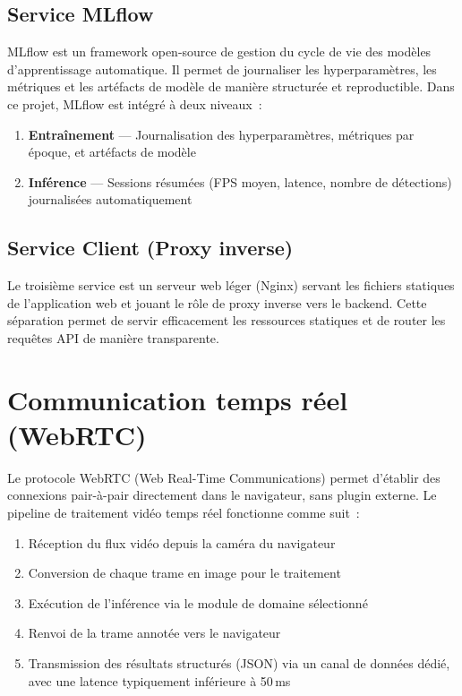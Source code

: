 \documentclass[12pt,a4paper]{report}
\begin{document}
\subsection{Service MLflow}

MLflow est un framework open-source de gestion du cycle de vie des mod\`eles d'apprentissage automatique. Il permet de journaliser les hyperparam\`etres, les m\'etriques et les art\'efacts de mod\`ele de mani\`ere structur\'ee et reproductible. Dans ce projet, MLflow est int\'egr\'e \`a deux niveaux~:
\begin{enumerate}
    \item \textbf{Entra\^inement} --- Journalisation des hyperparam\`etres, m\'etriques par \'epoque, et art\'efacts de mod\`ele
    \item \textbf{Inf\'erence} --- Sessions r\'esum\'ees (FPS moyen, latence, nombre de d\'etections) journalis\'ees automatiquement
\end{enumerate}

\subsection{Service Client (Proxy inverse)}

Le troisi\`eme service est un serveur web l\'eger (Nginx) servant les fichiers statiques de l'application web et jouant le r\^ole de proxy inverse vers le backend. Cette s\'eparation permet de servir efficacement les ressources statiques et de router les requ\^etes API de mani\`ere transparente.

\section{Communication temps r\'eel (WebRTC)}

Le protocole WebRTC (Web Real-Time Communications) permet d'\'etablir des connexions pair-\`a-pair directement dans le navigateur, sans plugin externe. Le pipeline de traitement vid\'eo temps r\'eel fonctionne comme suit~:
\begin{enumerate}
    \item R\'eception du flux vid\'eo depuis la cam\'era du navigateur
    \item Conversion de chaque trame en image pour le traitement
    \item Ex\'ecution de l'inf\'erence via le module de domaine s\'electionn\'e
    \item Renvoi de la trame annot\'ee vers le navigateur
    \item Transmission des r\'esultats structur\'es (JSON) via un canal de donn\'ees d\'edi\'e, avec une latence typiquement inf\'erieure \`a 50\,ms
\end{enumerate}
\end{document}
